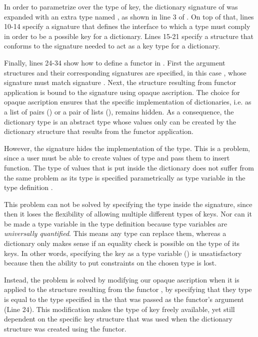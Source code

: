 In order to parametrize over the type of key, the dictionary signature of  was expanded with an extra type named , as shown in line 3 of .
On top of that, lines 10-14 specify a signature  that defines the interface to which a type must comply in order to be a possible key for a dictionary.
Lines 15-21 specify a structure  that conforms to the signature needed to act as a key type for a dictionary.

Finally, lines 24-34 show how to define a functor in \MiniML.
First the argument structures and their corresponding signatures are specified, in this case , whose signature must match signature .
Next, the structure resulting from functor application is bound to the  signature using opaque ascription.
The choice for opaque ascription ensures that the specific implementation of dictionaries, i.e. as a list of pairs () or a pair of lists (), remains hidden. As a consequence, the dictionary type is an abstract type whose values only can be created by the dictionary structure that results from the functor application.

However, the signature  hides the implementation of the  type.
This is a problem, since a user must be able to create values of type  and pass them to insert function.
The type of values that is put inside the dictionary does not suffer from the same problem as its type is specified parametrically as type variable  in the type definition .

This problem can not be solved by specifying the type inside the  signature, since then it loses the flexibility of allowing multiple different types of keys.
Nor can it be made a type variable in the type definition  because type variables are \emph{universally quantified}. 
This means any type can replace them, whereas a dictionary only makes sense if an equality check is possible on the type of its keys.
In other words, specifying the key as a type variable () is unsatisfactory because then the ability to put constraints on the chosen type is lost.

Instead, the problem is solved by modifying our opaque ascription when it is applied to the structure resulting from the functor , by specifying that they  type is equal to the type  specified in the  that was passed as the functor's argument (Line 24).
This modification makes the type of key freely available, yet still dependent on the specific key structure that was used when the dictionary structure was created using the functor.

